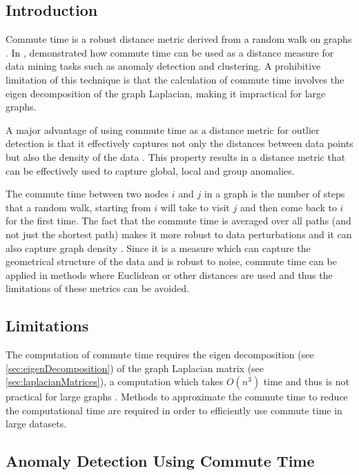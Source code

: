 \subsection{Introduction}
\label{commuteTime:introduction}
Commute time is a robust distance metric derived from a random walk on graphs
\cite{Khoa:2012}. In , \citeauthor{Khoa:2012} demonstrated
how commute time can be used as a distance measure for data mining tasks such as
anomaly detection and clustering. A prohibitive limitation of this technique is
that the calculation of commute time involves the eigen decomposition of the
graph Laplacian, making it impractical for large graphs.

A major advantage of using commute time as a distance metric for outlier
detection is that it effectively captures not only the distances between data
points but also the density of the data \citeNeeded. This property results in a
distance metric that can be effectively used to capture global, local and group
anomalies.

The commute time between two nodes $i$ and $j$ in a graph is the number of steps
that a random walk, starting from $i$ will take to visit $j$ and then come back
to $i$ for the first time. The fact that the commute time is averaged over all
paths (and not just the shortest path) makes it more robust to data
perturbations and it can also capture graph density \cite{Khoa:2012}. Since it
is a measure which can capture the geometrical structure of the data and is
robust to noise, commute time can be applied in methods where Euclidean or other
distances are used and thus the limitations of these metrics can be avoided.

\subsection{Limitations}
\label{commuteTime:limitations}
The computation of commute time requires the eigen decomposition (see
\autoref{sec:eigenDecomposition}) of the graph Laplacian matrix (see
\autoref{sec:laplacianMatrices}), a computation which takes $O(n^{3})$ time and
thus is not practical for large graphs \citeNeeded. Methods to approximate the
commute time to reduce the computational time are required in order to
efficiently use commute time in large datasets.

\subsection{Anomaly Detection Using Commute Time}
\label{commuteTime:anomalyDetection}
